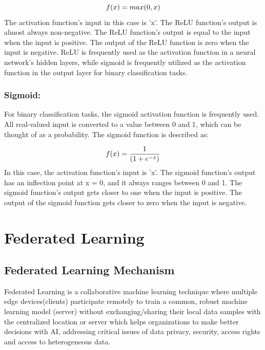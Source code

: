 \begin{equation}
\label{eq:relu}
    \textcolor{black}{f(x) = max(0, x)}
\end{equation}
The activation function's input in this case is 'x'. The ReLU function's output is almost always non-negative. The ReLU function's output is equal to the input when the input is positive. The output of the ReLU function is zero when the input is negative. ReLU is frequently used as the activation function in a neural network's hidden layers, while sigmoid is frequently utilized as the activation function in the output layer for binary classification tasks.

\subsubsection{Sigmoid:} 
For binary classification tasks, the sigmoid activation function is frequently used. All real-valued input is converted to a value between 0 and 1, which can be thought of as a probability. The sigmoid function is described as:

\begin{equation}
\label{eq:sigmoid}
    \textcolor{black}{f(x) = \frac{1}{(1+e^{-x})}}
\end{equation}
In this case, the activation function's input is 'x'. The sigmoid function's output has an inflection point at x = 0, and it always ranges between 0 and 1. The sigmoid function's output gets closer to one when the input is positive. The output of the sigmoid function gets closer to zero when the input is negative.


\section{Federated Learning}
\subsection{Federated Learning Mechanism}
Federated Learning is a collaborative machine learning technique where multiple edge devices(clients) participate remotely to train a common, robust machine learning model (server) without exchanging/sharing their local data samples with the centralized location or server which helps organizations to make better decisions with AI, addressing critical issues of data privacy, security, access rights and access to heterogeneous data.


